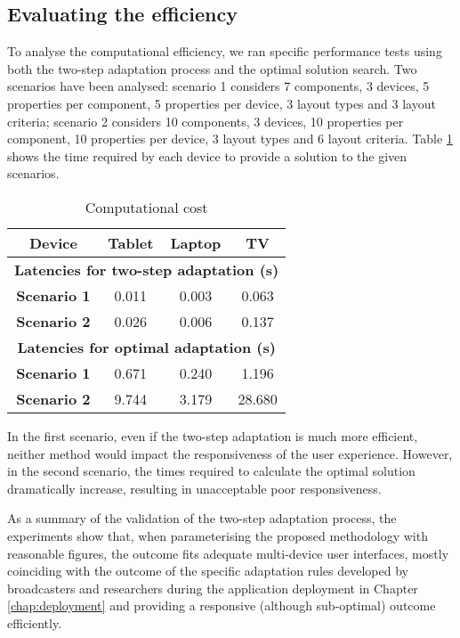 \subsection{Evaluating the efficiency}
To analyse the computational efficiency, we ran specific performance tests using both the two-step adaptation process and the optimal solution search. 
Two scenarios have been analysed: scenario 1 considers 7 components, 3 devices, 5 properties per component, 5 properties per device, 3 layout types and 3 layout criteria; scenario 2 considers 10 components, 3 devices, 10 properties per component, 10 properties per device, 3 layout types and 6 layout criteria. 
Table \ref{tab:computational} shows the time required by each device to provide a solution to the given scenarios.

\begin{table}
	\centering
	\caption {Computational cost}\label{tab:computational}
	\begin{tabular}{||c|c|c|c||}
		\hline
		\textbf{Device} & \textbf{Tablet} & \textbf{Laptop} & \textbf{TV} \\
		\hline
		\multicolumn{4}{||c||}{\cellcolor{lightgray}\textbf{Latencies for two-step adaptation (s)} }\\
		\hline
		\textbf{Scenario 1} & 0.011 & 0.003 & 0.063  \\
		\hline
		\textbf{Scenario 2} & 0.026 & 0.006 & 0.137  \\
		\hline
		\multicolumn{4}{||c||}{\textbf{\cellcolor{lightgray} Latencies for optimal adaptation (s)} }\\
		\hline
		\textbf{Scenario 1} & 0.671 & 0.240 & 1.196  \\
		\hline
		\textbf{Scenario 2} & 9.744 & 3.179 & 28.680  \\
		\hline
		
		\hline
	\end{tabular}
\end{table}

In the first scenario, even if the two-step adaptation is much more efficient, neither method would impact the responsiveness of the user experience. However, in the second scenario, the times required to calculate the optimal solution dramatically increase, resulting in unacceptable poor responsiveness.   

As a summary of the validation of the two-step adaptation process, the experiments show that, when parameterising the proposed methodology with reasonable figures, the outcome fits adequate multi-device user interfaces, mostly coinciding with the outcome of the specific adaptation rules developed by broadcasters and researchers during the application deployment in Chapter \ref{chap:deployment} and providing a responsive (although sub-optimal) outcome efficiently. 

